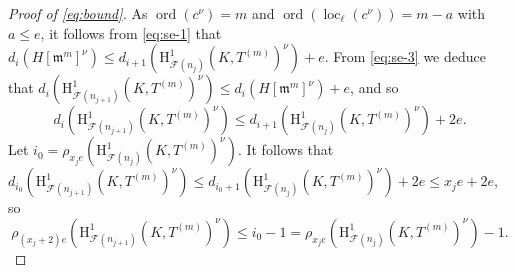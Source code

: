 \documentclass[a4paper,10pt]{amsart}
\numberwithin{equation}{section}
\numberwithin{equation}{section}
\theoremstyle{plain}
\theoremstyle{definition}
\theoremstyle{definition}
\theoremstyle{plain}
\theoremstyle{plain}
\theoremstyle{plain}
\theoremstyle{plain}
\DeclareMathOperator{\ord}{ord}
\newcommand{\F}{\mathcal{F}}
\DeclareMathOperator{\loc}{loc}
\newcommand{\Fcal}{\mathcal{F}}
\newcommand{\fm}{\mathfrak{m}}
\newcommand{\rH}{\mathrm{H}}
\begin{document}
\begin{proof}[Proof of \eqref{eq:bound}]
As $\ord(c^{\nu}) = m$ and $\ord(\loc_\ell(c^{\nu})) = m-a$ with $a\leq e$, it follows from \eqref{eq:se-1}
that $d_i(H[\fm^m]^{\nu}) \leq d_{i+1}(\rH^1_{\F(n_j)}(K,T^{(m)})^{\nu})+e$.  From \eqref{eq:se-3} we deduce
that $d_i(\rH^1_{\F(n_{j+1})}(K,T^{(m)})^{\nu})\leq d_i(H[\fm^m]^{\nu}) +e$, and so
$$
d_i(\rH^1_{\F(n_{j+1})}(K,T^{(m)})^{\nu}) \leq d_{i+1}(\rH^1_{\F(n_j)}(K,T^{(m)})^{\nu})+2e.
$$
Let $i_0=\rho_{x_je}(\rH^1_{\F(n_j)}(K, T^{(m)})^{\nu})$. It follows that
$d_{i_0}(\rH^1_{\F(n_{j+1})}(K,T^{(m)})^{\nu}) \leq d_{i_0+1}(\rH^1_{\F(n_j)}(K,T^{(m)})^{\nu})+2e \leq x_j e + 2e$, 
so 
\begin{equation}\label{eq:rhopluspart}
\rho_{(x_j+2)e}(\rH^1_{\F(n_{j+1})}(K, T^{(m)})^{\nu}) \leq i_0-1  = \rho_{x_je}(\rH^1_{\F(n_j)}(K, T^{(m)})^{\nu})-1.
\end{equation}




\end{proof}
\end{document}
